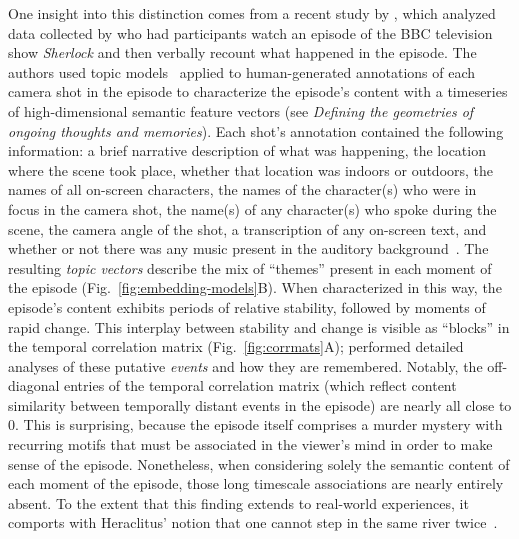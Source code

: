 \documentclass{article}
\begin{document}
One insight into this distinction comes from a recent study by \cite{HeusEtal18c}, which analyzed data collected by \cite{ChenEtal17} who had participants watch an episode of the BBC television show \textit{Sherlock} and then verbally recount what happened in the episode.  The authors used topic models~\citep{BleiEtal03} applied to human-generated annotations of each camera shot in the episode to characterize the episode's content with a timeseries of high-dimensional semantic feature vectors (see \textit{Defining the geometries of ongoing thoughts and memories}).  Each shot's annotation contained the following information: a brief narrative description of what was happening, the location where the scene took place, whether that location was indoors or outdoors, the names of all on-screen characters, the names of the character(s) who were in focus in the camera shot, the name(s) of any character(s) who spoke during the scene, the camera angle of the shot, a transcription of any on-screen text, and whether or not there was any music present in the auditory background~\citep[full details may be found in][]{ChenEtal17}.  The resulting \textit{topic vectors} describe the mix of ``themes'' present in each moment of the episode (Fig.~\ref{fig:embedding-models}B).  When characterized in this way, the episode's content exhibits periods of relative stability, followed by moments of rapid change. This interplay between stability and change is visible as ``blocks'' in the temporal correlation matrix (Fig.~\ref{fig:corrmats}A); \cite{HeusEtal18c} performed detailed analyses of these putative \textit{events} and how they are remembered.  Notably, the off-diagonal entries of the temporal correlation matrix (which reflect content similarity between temporally distant events in the episode) are nearly all close to 0.  This is surprising, because the episode itself comprises a murder mystery with recurring motifs that must be associated in the viewer's mind in order to make sense of the episode.  Nonetheless, when considering solely the semantic content of each moment of the episode, those long timescale associations are nearly entirely absent.  To the extent that this finding extends to real-world experiences, it comports with Heraclitus' notion that one cannot step in the same river twice~\citep{Hera}.
\end{document}
